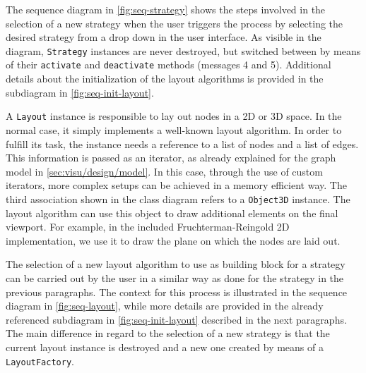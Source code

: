 The sequence diagram in \vref{fig:seq-strategy} shows the steps involved in the selection of a new strategy when the user triggers the process by selecting the desired strategy from a drop down in the user interface. As visible in the diagram, \texttt{Strategy} instances are never destroyed, but switched between by means of their \texttt{activate} and \texttt{deactivate} methods (messages 4 and 5). Additional details about the initialization of the layout algorithms is provided in the subdiagram in \vref{fig:seq-init-layout}.

A \texttt{Layout} instance is responsible to lay out nodes in a 2D or 3D space. In the normal case, it simply implements a well-known layout algorithm. In order to fulfill its task, the instance needs a reference to a list of nodes and a list of edges. This information is passed as an iterator, as already explained for the graph model in \vref{sec:visu/design/model}. In this case, through the use of custom iterators, more complex setups can be achieved in a memory efficient way. The third association shown in the class diagram refers to a \texttt{Object3D} instance. The layout algorithm can use this object to draw additional elements on the final viewport. For example, in the included Fruchterman-Reingold 2D implementation, we use it to draw the plane on which the nodes are laid out.

The selection of a new layout algorithm to use as building block for a strategy can be carried out by the user in a similar way as done for the strategy in the previous paragraphs. The context for this process is illustrated in the sequence diagram in \vref{fig:seq-layout}, while more details are provided in the already referenced subdiagram in \vref{fig:seq-init-layout} described in the next paragraphs. The main difference in regard to the selection of a new strategy is that the current layout instance is destroyed and a new one created by means of a \texttt{LayoutFactory}.

